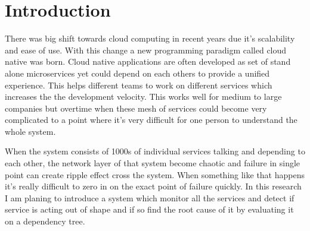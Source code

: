 \section{Introduction}

There was big shift towards cloud computing in recent years due it's scalability and  ease of use. With this change a new programming paradigm called cloud native was born. Cloud native applications are often developed as set of stand alone microservices \citep{dragoni2017microservices} yet could depend on each others to provide a unified experience. This helps different teams to work on different services which increases the the development velocity. This works well for medium to large companies but overtime when these mesh of services could become very complicated to a point where it's very difficult for one person to understand the whole system.

When the system consists of 1000s of individual services talking and depending to each other, the network layer of that system become chaotic \citep{Introduc54:online} and failure in single point can create ripple effect cross the system. When something like that happens it's really difficult to zero in on the exact point of failure quickly. In this research I am planing to introduce a system which monitor all the services and detect if service is acting out of shape and if so find the root cause of it by evaluating it on a dependency tree.
